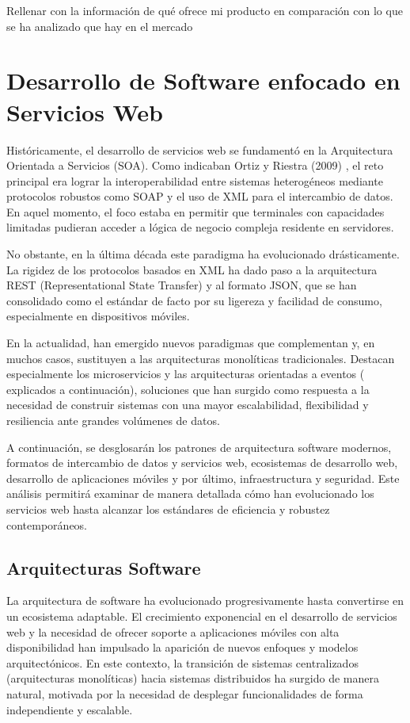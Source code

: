 Rellenar con la información de qué ofrece mi producto en comparación con lo que se ha analizado que hay en el mercado

\section{Desarrollo de Software enfocado en Servicios Web}

Históricamente, el desarrollo de servicios web se fundamentó en la Arquitectura Orientada a Servicios (SOA). Como 
indicaban Ortiz y Riestra (2009) \cite{evolucionDinamicaSistemasSoftware}, el reto principal era lograr la 
interoperabilidad entre sistemas heterogéneos mediante protocolos robustos como SOAP y el uso de XML para el 
intercambio de datos. En aquel momento, el foco estaba en permitir que terminales con capacidades limitadas pudieran
acceder a lógica de negocio compleja residente en servidores.

No obstante, en la última década este paradigma ha evolucionado drásticamente. La rigidez de los protocolos basados 
en XML ha dado paso a la arquitectura REST (Representational State Transfer) y al formato JSON, que se han consolidado
como el estándar de facto por su ligereza y facilidad de consumo, especialmente en dispositivos móviles.

En la actualidad, han emergido nuevos paradigmas que complementan y, en muchos casos, sustituyen a las arquitecturas 
monolíticas tradicionales. Destacan especialmente los microservicios y las arquitecturas orientadas a eventos (
explicados a continuación), soluciones que han surgido como respuesta a la necesidad de construir sistemas con una 
mayor escalabilidad, flexibilidad y resiliencia ante grandes volúmenes de datos.

A continuación, se desglosarán los patrones de arquitectura software modernos, formatos de intercambio de datos y  
servicios web, ecosistemas de desarrollo web, desarrollo de aplicaciones móviles y por último, infraestructura
y seguridad. Este análisis permitirá examinar de manera detallada cómo han evolucionado los servicios web hasta 
alcanzar los estándares de eficiencia y robustez contemporáneos.

\subsection{Arquitecturas Software}

La arquitectura de software ha evolucionado progresivamente hasta convertirse en un ecosistema adaptable. El 
crecimiento exponencial en el desarrollo de servicios web y la necesidad de ofrecer soporte a aplicaciones móviles 
con alta disponibilidad han impulsado la aparición de nuevos enfoques y modelos arquitectónicos. En este contexto, 
la transición de sistemas centralizados (arquitecturas monolíticas) hacia sistemas distribuidos ha surgido de manera 
natural, motivada por la necesidad de desplegar funcionalidades de forma independiente y escalable.

